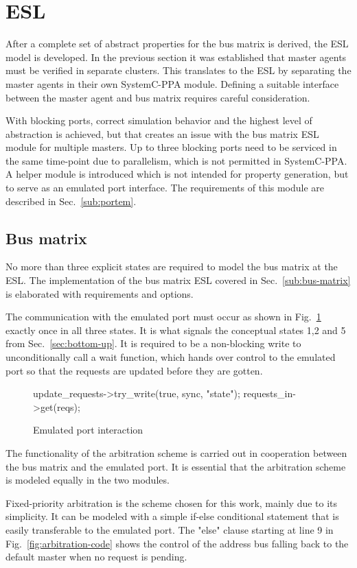 \section{ESL}
After a complete set of abstract properties for the bus matrix is derived, the ESL model is developed. In the previous section it was established that master agents must be verified in separate clusters. This translates to the ESL by separating the master agents in their own SystemC-PPA module. Defining a suitable interface between the master agent and bus matrix requires careful consideration. \par
With blocking ports, correct simulation behavior and the highest level of abstraction is achieved, but that creates an issue with the bus matrix ESL module for multiple masters. Up to three blocking ports need to be serviced in the same time-point due to parallelism, which is not permitted in SystemC-PPA. A helper module is introduced which is not intended for property generation, but to serve as an emulated port interface. The requirements of this module are described in Sec.~\ref{sub:portem}.

\subsection{Bus matrix}
\label{sub:bus-matrix-design}
No more than three explicit states are required to model the bus matrix at the ESL. The implementation of the bus matrix ESL covered in Sec.~\ref{sub:bus-matrix} is elaborated with requirements and options. \par
The communication with the emulated port must occur as shown in Fig.~\ref{fig:em-port-code} exactly once in all three states. It is what signals the conceptual states 1,2 and 5 from Sec.~\ref{sec:bottom-up}. It is required to be a non-blocking write to unconditionally call a wait function, which hands over control to the emulated port so that the requests are updated before they are gotten. 
\begin{figure}[h!]
\begin{C++}
update_requests->try_write(true, sync, "state");  
requests_in->get(reqs); 
\end{C++}
\caption{Emulated port interaction}
\label{fig:em-port-code}
\end{figure}

The functionality of the arbitration scheme is carried out in cooperation between the bus matrix and the emulated port. It is essential that the arbitration scheme is modeled equally in the two modules. \par
Fixed-priority arbitration is the scheme chosen for this work, mainly due to its simplicity. It can be modeled with a simple if-else conditional statement that is easily transferable to the emulated port. The "else" clause starting at line 9 in Fig.~\ref{fig:arbitration-code} shows the control of the address bus falling back to the default master when no request is pending.

